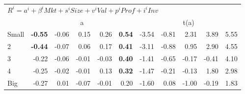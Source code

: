 \begin{tabular}{lrrrrrrrrrr}
  
    

  \midrule
  \multicolumn{11}{l}{$R^i=a^i+\beta^iMkt+s^iSize+v^iVal+p^iProf+i^iInv$}  \\
  
     & \multicolumn{5}{c}{a} & \multicolumn{5}{c}{t(a)}   \\
     \cmidrule(r){2-6} \cmidrule(r){7-11} 
    Small  & \textbf{-0.55}  & -0.06  & 0.15  & 0.26  & \textbf{0.54}  & -3.54  & -0.81  & 2.31  & 3.89  & 5.55   \\
    2  & \textbf{-0.44}  & -0.07  & 0.06  & 0.17  & \textbf{0.41}  & -3.11  & -0.88  & 0.95  & 2.90  & 4.55   \\
    3  & -0.22  & -0.06  & -0.01  & -0.03  & \textbf{0.40}  & -1.41  & -0.65  & -0.17  & -0.41  & 4.10   \\
    4  & -0.25  & -0.02  & -0.01  & 0.13  & \textbf{0.32}  & -1.47  & -0.21  & -0.13  & 1.80  & 2.98   \\
    Big  & -0.27  & 0.01  & -0.07  & -0.01  & 0.20  & -1.60  & 0.08  & -1.00  & -0.19  & 1.83   \\

  \bottomrule
\end{tabular}
